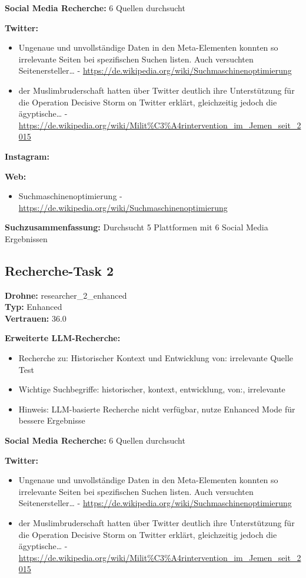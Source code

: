 \documentclass[12pt,a4paper]{article}
\begin{document}
\textbf{Social Media Recherche:} 6 Quellen durchsucht

\textbf{Twitter:}
\begin{itemize}
\item  Ungenaue und unvollständige Daten in den Meta-Elementen konnten so irrelevante Seiten bei spezifischen Suchen listen. Auch versuchten Seitenersteller… - \url{https://de.wikipedia.org/wiki/Suchmaschinenoptimierung}
\item der Muslimbruderschaft hatten über Twitter deutlich ihre Unterstützung für die Operation Decisive Storm on Twitter erklärt, gleichzeitig jedoch die ägyptische… - \url{https://de.wikipedia.org/wiki/Milit%C3%A4rintervention_im_Jemen_seit_2015}
\end{itemize}

\textbf{Instagram:}
\begin{itemize}
\end{itemize}

\textbf{Web:}
\begin{itemize}
\item Suchmaschinenoptimierung - \url{https://de.wikipedia.org/wiki/Suchmaschinenoptimierung}
\end{itemize}

\textbf{Suchzusammenfassung:} Durchsucht 5 Plattformen mit 6 Social Media Ergebnissen

\subsection{Recherche-Task 2}

\textbf{Drohne:} researcher\_2\_enhanced\\
\textbf{Typ:} Enhanced\\
\textbf{Vertrauen:} 36.0%

\textbf{Erweiterte LLM-Recherche:}
\begin{itemize}
\item Recherche zu: Historischer Kontext und Entwicklung von: irrelevante Quelle Test
\item Wichtige Suchbegriffe: historischer, kontext, entwicklung, von:, irrelevante
\item Hinweis: LLM-basierte Recherche nicht verfügbar, nutze Enhanced Mode für bessere Ergebnisse
\end{itemize}

\textbf{Social Media Recherche:} 6 Quellen durchsucht

\textbf{Twitter:}
\begin{itemize}
\item  Ungenaue und unvollständige Daten in den Meta-Elementen konnten so irrelevante Seiten bei spezifischen Suchen listen. Auch versuchten Seitenersteller… - \url{https://de.wikipedia.org/wiki/Suchmaschinenoptimierung}
\item der Muslimbruderschaft hatten über Twitter deutlich ihre Unterstützung für die Operation Decisive Storm on Twitter erklärt, gleichzeitig jedoch die ägyptische… - \url{https://de.wikipedia.org/wiki/Milit%C3%A4rintervention_im_Jemen_seit_2015}
\end{itemize}
\end{document}
